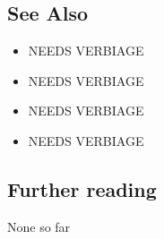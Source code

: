 \subsection[See Also]{See Also}\label{see-also}

\begin{itemize}
\item{%
NEEDS VERBIAGE}
\item{%
NEEDS VERBIAGE}
\item{%
NEEDS VERBIAGE}
\item{%
NEEDS VERBIAGE}
\end{itemize}

\subsection[Further reading]{Further reading}\label{further-reading}

None so far


